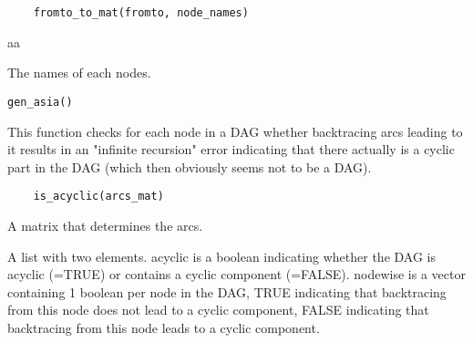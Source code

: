 \documentclass[letterpaper]{book}
\begin{document}
%
\begin{Usage}
\begin{verbatim}
	fromto_to_mat(fromto, node_names)
\end{verbatim}
\end{Usage}
%
\begin{Arguments}
\begin{ldescription}
\item[\code{fromto}]  aa 
\item[\code{node\_names}]  The names of each nodes. 
\end{ldescription}
\end{Arguments}
%
\begin{Usage}
\begin{verbatim}
gen_asia()
\end{verbatim}
\end{Usage}
%
\begin{Description}\relax
This function checks for each node in a DAG whether backtracing arcs leading to it results in an "infinite recursion" error indicating that there actually is a cyclic part in the DAG (which then obviously seems not to be a DAG).
\end{Description}
%
\begin{Usage}
\begin{verbatim}
	is_acyclic(arcs_mat)
\end{verbatim}
\end{Usage}
%
\begin{Arguments}
\begin{ldescription}
\item[\code{arcs\_mat}]  A matrix that determines the arcs. 
\end{ldescription}
\end{Arguments}
%
\begin{Value}
A list with two elements. acyclic is a boolean indicating whether the DAG is acyclic (=TRUE) or contains a cyclic component (=FALSE). nodewise is a vector containing 1 boolean per node in the DAG, TRUE indicating that backtracing from this node does not lead to a cyclic component, FALSE indicating that backtracing from this node leads to a cyclic component.
\end{Value}
\end{document}
